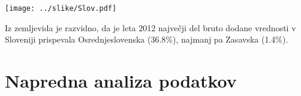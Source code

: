 \documentclass[a4paper, 11pt]{article}
\begin{document}
\newpage
\begin{center}
\texttt{[image: ../slike/Slov.pdf]}
\end{center}

Iz zemljevida je razvidno, da je leta 2012 največji del bruto dodane vrednosti v Sloveniji prispevala Osrednjeslovenska (36.8\%), najmanj pa Zasavska (1.4\%).


\section{Napredna analiza podatkov}
\end{document}
